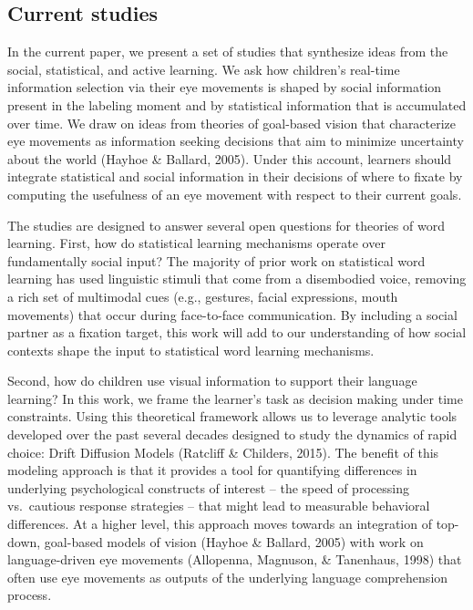 \documentclass[man,floatsintext]{apa6}
\begin{document}
\subsection{Current studies}\label{current-studies}

In the current paper, we present a set of studies that synthesize ideas
from the social, statistical, and active learning. We ask how children's
real-time information selection via their eye movements is shaped by
social information present in the labeling moment and by statistical
information that is accumulated over time. We draw on ideas from
theories of goal-based vision that characterize eye movements as
information seeking decisions that aim to minimize uncertainty about the
world (Hayhoe \& Ballard, 2005). Under this account, learners should
integrate statistical and social information in their decisions of where
to fixate by computing the usefulness of an eye movement with respect to
their current goals.

The studies are designed to answer several open questions for theories
of word learning. First, how do statistical learning mechanisms operate
over fundamentally social input? The majority of prior work on
statistical word learning has used linguistic stimuli that come from a
disembodied voice, removing a rich set of multimodal cues (e.g.,
gestures, facial expressions, mouth movements) that occur during
face-to-face communication. By including a social partner as a fixation
target, this work will add to our understanding of how social contexts
shape the input to statistical word learning mechanisms.

Second, how do children use visual information to support their language
learning? In this work, we frame the learner's task as decision making
under time constraints. Using this theoretical framework allows us to
leverage analytic tools developed over the past several decades designed
to study the dynamics of rapid choice: Drift Diffusion Models (Ratcliff
\& Childers, 2015). The benefit of this modeling approach is that it
provides a tool for quantifying differences in underlying psychological
constructs of interest -- the speed of processing vs.~cautious response
strategies -- that might lead to measurable behavioral differences. At a
higher level, this approach moves towards an integration of top-down,
goal-based models of vision (Hayhoe \& Ballard, 2005) with work on
language-driven eye movements (Allopenna, Magnuson, \& Tanenhaus, 1998)
that often use eye movements as outputs of the underlying language
comprehension process.
\end{document}
